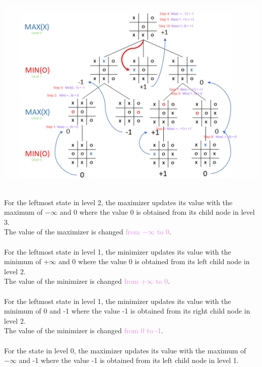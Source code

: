 \documentclass{book}
\begin{document}
\begin{center}
    \includegraphics[scale=0.45]{chapter 10/ch10_figure2.png}
\end{center}
\newpage
{}\\
For the leftmost state in level 2, the maximizer updates its value with the maximum of $-\infty$ and 0 where the value 0 is obtained from its child node in level 3.\\
The value of the maximizer is changed \textcolor{violet}{from $-\infty$ to 0}.\\
\vspace{3mm}
\\
For the leftmost state in level 1, the minimizer updates its value with the minimum of $+\infty$ and 0 where the value 0 is obtained from its left child node in level 2.\\
The value of the minimizer is changed \textcolor{violet}{from $+\infty$ to 0}.\\
\vspace{3mm}
\\
For the leftmost state in level 1, the minimizer updates its value with the minimum of 0 and -1 where the value -1 is obtained from its right child node in level 2.\\
The value of the minimizer is changed \textcolor{violet}{from 0 to -1}.\\
\vspace{3mm}
\\
For the state in level 0, the maximizer updates its value with the maximum of $-\infty$ and -1 where the value -1 is obtained from its left child node in level 1.\\
\end{document}
